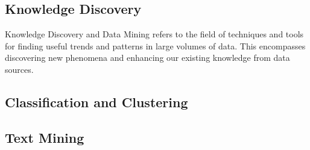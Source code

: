 \documentclass[12pt]{article}
\begin{document}
\begin{doublespacing}
\pagebreak
\section{Knowledge Discovery}
Knowledge Discovery and Data Mining refers to the field of techniques and tools for finding useful trends and patterns in large volumes of data.
This encompasses discovering new phenomena and enhancing our existing knowledge from data sources.

\subsection{Classification and Clustering}

\subsection{Text Mining}


\pagebreak
\end{doublespacing}


\end{document}
